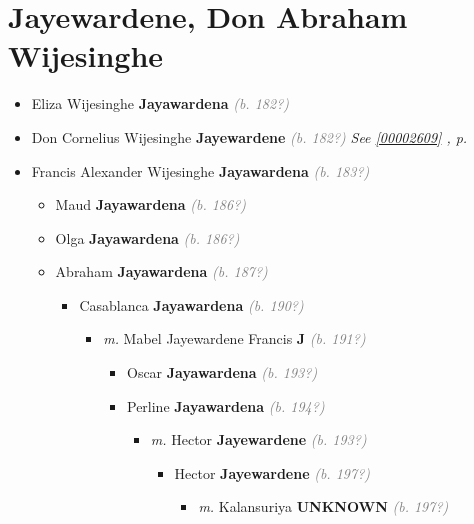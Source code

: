 \documentclass[10pt, openany]{book}
\begin{document}
\chapter{Jayewardene, Don Abraham Wijesinghe}
\label{00002605}
\textcolor{slmaroon}{\textit{}}
\begin{itemize}
\item{Eliza Wijesinghe \textbf{Jayawardena} \textcolor{gray}{\textit{(b. 182?)}}
  }
\item{Don Cornelius Wijesinghe \textbf{Jayewardene} \textcolor{gray}{\textit{(b. 182?)}} \textcolor{slteal}{\textit{See  \autoref{00002609} \textit{, p. \pageref{00002609} }}}}
\item{Francis Alexander Wijesinghe \textbf{Jayawardena} \textcolor{gray}{\textit{(b. 183?)}}
\begin{itemize}
\item{Maud \textbf{Jayawardena} \textcolor{gray}{\textit{(b. 186?)}}
 }
\item{Olga \textbf{Jayawardena} \textcolor{gray}{\textit{(b. 186?)}}
 }
\item{Abraham \textbf{Jayawardena} \textcolor{gray}{\textit{(b. 187?)}}
\begin{itemize}
\item{Casablanca \textbf{Jayawardena} \textcolor{gray}{\textit{(b. 190?)}}
\begin{itemize}
\item{\textit{m.} Mabel Jayewardene Francis \textbf{J} \textcolor{gray}{\textit{(b. 191?)}}   \label{couple:00003102:00003103} \begin{itemize}
\item{Oscar \textbf{Jayawardena} \textcolor{gray}{\textit{(b. 193?)}}
 }
\item{Perline \textbf{Jayawardena} \textcolor{gray}{\textit{(b. 194?)}}
\begin{itemize}
\item{\textit{m.} Hector \textbf{Jayewardene} \textcolor{gray}{\textit{(b. 193?)}}   \label{couple:00003104:00003105} \begin{itemize}
\item{Hector \textbf{Jayewardene} \textcolor{gray}{\textit{(b. 197?)}}
\begin{itemize}
\item{\textit{m.} Kalansuriya \textbf{UNKNOWN} \textcolor{gray}{\textit{(b. 197?)}}   \label{couple:00003106:00003107} \begin{itemize}

\end{itemize}}
\end{itemize}}
\end{itemize}}
\end{itemize}}
\end{itemize}}
\end{itemize}}
\end{itemize}}
\end{itemize}}
\end{itemize}
\end{document}
